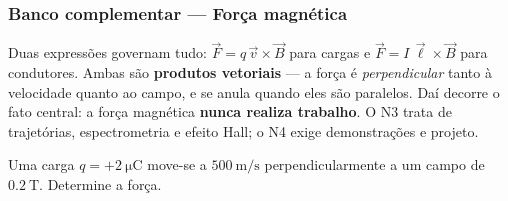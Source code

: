 
\subsubsection*{Banco complementar --- Força magnética}

\begin{atencao}
Duas expressões governam tudo: $\vec F=q\,\vec v\times\vec B$ para cargas e
$\vec F=I\,\vec\ell\times\vec B$ para condutores. Ambas são \textbf{produtos
vetoriais} --- a força é \emph{perpendicular} tanto à velocidade quanto ao
campo, e se anula quando eles são paralelos. Daí decorre o fato central: a força
magnética \textbf{nunca realiza trabalho}. O N3 trata de trajetórias,
espectrometria e efeito Hall; o N4 exige demonstrações e projeto.
\end{atencao}

\blocofixacao

\begin{questao}[1]{}
Uma carga $q=+\SI{2}{\micro\coulomb}$ move-se a $\SI{500}{\meter\per\second}$
perpendicularmente a um campo de $\SI{0.2}{\tesla}$. Determine a força.
\end{questao}

